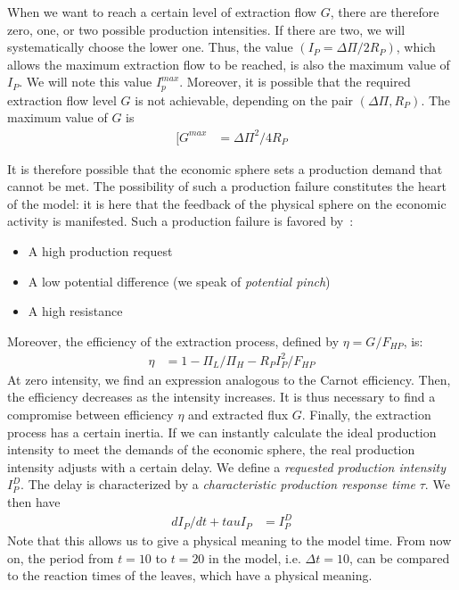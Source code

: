 \documentclass[12pt,a4paper]{article}%
\begin{document}
\begin{appendix}
When we want to reach a certain level of extraction flow $G$, there are therefore zero, one, or two possible production intensities. If there are two, we will systematically choose the lower one. Thus, the value $(I_{P}=\Delta \Pi/2 R_{P})$, which allows the maximum extraction flow to be reached, is also the maximum value of $I_{P}$. We will note this value $I_{p}^{max}$.  Moreover, it is possible that the required extraction flow level $G$ is not achievable, depending on the pair $(\Delta \Pi ,R_{P})$. The maximum value of $G$ is 
\begin{align}
	[G^{max} &= \Delta\Pi^{2}/4R_{P}
\end{align}

It is therefore possible that the economic sphere sets a production demand that cannot be met. The possibility of such a production failure constitutes the heart of the model: it is here that the feedback of the physical sphere on the economic activity is manifested. Such a production failure is favored by~:  
\begin{itemize} 
	\item A high production request 
	\item A low potential difference (we speak of \textit{potential pinch}) 
	\item A high resistance 
\end{itemize} 
Moreover, the efficiency of the extraction process, defined by $\eta=G/F_{HP}$, is: \begin{align}
	\eta &= 1-\Pi_{L}/\Pi_{H}-R_{P}I_{P}^{2}/F_{HP}
\end{align} 
At zero intensity, we find an expression analogous to the Carnot efficiency. Then, the efficiency decreases as the intensity increases. It is thus necessary to find a compromise between efficiency $\eta$ and extracted flux $G$. Finally, the extraction process has a certain inertia. If we can instantly calculate the ideal production intensity to meet the demands of the economic sphere, the real production intensity adjusts with a certain delay. We define a \textit{requested production intensity }$I_{P}^{D}$. The delay is characterized by a \textit{characteristic production response time }$\tau$.  We then have 
\begin{align}
	dI_{P}/dt+tau I_{P} &= I_{P}^{D}
\end{align}
Note that this allows us to give a physical meaning to the model time. From now on, the period from $t=10$ to $t=20$ in the model, i.e. $\Delta t=10$, can be compared to the reaction times of the leaves, which have a physical meaning.  


\end{appendix}
\end{document}
